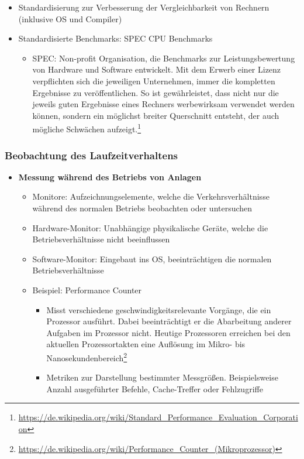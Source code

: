 \begin{itemize}
\begin{itemize}
		\item Standardisierung zur Verbesserung der Vergleichbarkeit von Rechnern (inklusive OS und Compiler)
		\item Standardisierte Benchmarks: SPEC CPU Benchmarks
		\begin{itemize}
			\item SPEC: Non-profit Organisation, die Benchmarks zur Leistungsbewertung von Hardware und Software entwickelt. Mit dem Erwerb einer Lizenz verpflichten sich die jeweiligen Unternehmen, immer die kompletten Ergebnisse zu veröffentlichen. So ist gewährleistet, dass nicht nur die jeweils guten Ergebnisse eines Rechners werbewirksam verwendet werden können, sondern ein möglichst breiter Querschnitt entsteht, der auch mögliche Schwächen aufzeigt.\footnote{\url{https://de.wikipedia.org/wiki/Standard_Performance_Evaluation_Corporation}}
		\end{itemize}
	\end{itemize}
\end{itemize}

\subsubsection{Beobachtung des Laufzeitverhaltens}
\begin{itemize}
	\item \textbf{Messung während des Betriebs von Anlagen}
	\begin{itemize}
		\item Monitore: Aufzeichnungselemente, welche die Verkehrsverhältnisse während des normalen Betriebs beobachten oder untersuchen
		\item Hardware-Monitor: Unabhängige physikalische Geräte, welche die Betriebsverhältnisse nicht beeinflussen
		\item Software-Monitor: Eingebaut ins OS, beeinträchtigen die normalen Betriebsverhältnisse
		\item Beispiel: Performance Counter
		\begin{itemize}
			\item Misst verschiedene geschwindigkeitsrelevante Vorgänge, die ein Prozessor ausführt. Dabei beeinträchtigt er die Abarbeitung anderer Aufgaben im Prozessor nicht. Heutige Prozessoren erreichen bei den aktuellen Prozessortakten eine Auflösung im Mikro- bis Nanosekundenbereich\footnote{\url{https://de.wikipedia.org/wiki/Performance_Counter_(Mikroprozessor)}}
			\item Metriken zur Darstellung bestimmter Messgrößen. Beispielsweise Anzahl ausgeführter Befehle, Cache-Treffer oder Fehlzugriffe
		\end{itemize}
	\end{itemize}
\end{itemize}

